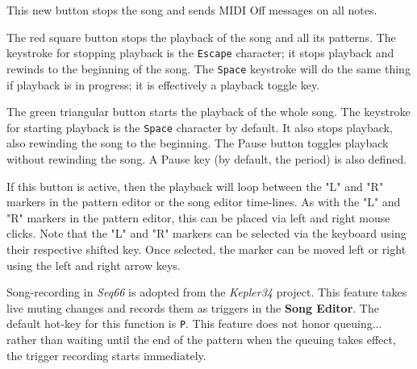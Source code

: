    \setcounter{ItemCounter}{0}      %

   This new button stops the song and sends MIDI Off messages on all notes.

   The red square button stops the playback of the song and all its patterns.
   The keystroke for stopping playback is the \texttt{Escape} character; it
   stops playback and rewinds to the beginning of the song.
   The \texttt{Space} keystroke will do the same thing if playback is in
   progress; it is effectively a playback toggle key.

   The green triangular button starts the playback of the whole song.
   The keystroke for starting playback is the \texttt{Space} character by
   default.  It also stops playback, also rewinding the song to the beginning.
   The Pause button toggles playback without rewinding the song.
   A Pause key (by default, the period) is also defined.

   If this button is active, then the playback will loop
   between the "L" and "R" markers in the pattern editor or the song editor
   time-lines.
   As with the "L" and "R" markers in the pattern editor, this can
   be placed via left and right mouse clicks.
   Note that the "L" and "R" markers can be selected via the keyboard using
   their respective shifted key.  Once selected, the marker can be moved left
   or right using the left and right arrow keys.

   Song-recording in \textsl{Seq66} is adopted from the
   \textsl{Kepler34} project.
   This feature takes live muting changes and records them as
   triggers in the \textbf{Song Editor}.
   The default hot-key for this function is \texttt{P}.
   This feature does not honor queuing...
   rather than waiting until the end of the pattern when the queuing takes
   effect, the trigger recording starts immediately.


